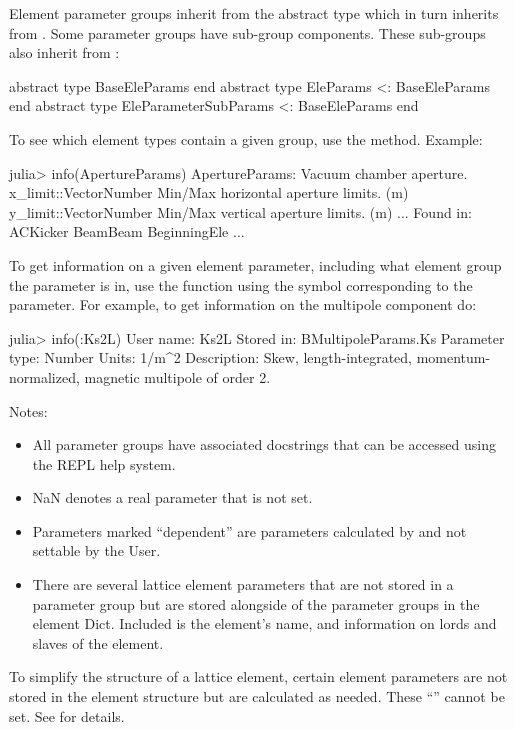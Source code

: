 Element parameter groups inherit from the abstract type  which
in turn inherits from . Some
parameter groups have sub-group components. 
These sub-groups also inherit from :
\begin{example}
  abstract type BaseEleParams end
  abstract type EleParams <: BaseEleParams end
  abstract type EleParameterSubParams <: BaseEleParams end
\end{example}

To see which element types contain a given group, use the 
method. Example:
\begin{example}
  julia> info(ApertureParams)
  ApertureParams: Vacuum chamber aperture.
    x_limit::Vector{Number}         Min/Max horizontal aperture limits. (m)
    y_limit::Vector{Number}         Min/Max vertical aperture limits. (m)
  ...
  Found in:
    ACKicker
    BeamBeam
    BeginningEle
    ...
\end{example}

To get information on a given element parameter, including what element group the parameter is in,
use the  function using the symbol corresponding to the parameter. For example,
to get information on the multipole component  do:
\begin{example}
  julia> info(:Ks2L)
    User name:       Ks2L
    Stored in:       BMultipoleParams.Ks
    Parameter type:  Number
    Units:           1/m^2
    Description:     Skew, length-integrated, momentum-normalized, 
                                          magnetic multipole of order 2.
\end{example}
  
Notes:
\begin{itemize}
%
\item
All parameter groups have associated docstrings that can be accessed using the REPL help system.
%
\item
NaN denotes a real parameter that is not set.
%
\item
Parameters marked ``dependent'' are parameters calculated by \accellat and not settable by the User.
%
\item
There are several lattice element parameters that are not stored in a parameter group but are stored
alongside of the parameter groups in the element Dict. Included is the element's name, and information
on lords and slaves of the element.
%
\end{itemize}

To simplify the structure of a lattice element, certain element parameters are not stored in the 
element structure but are calculated as needed. These ``'' cannot be set.
See  for details.

